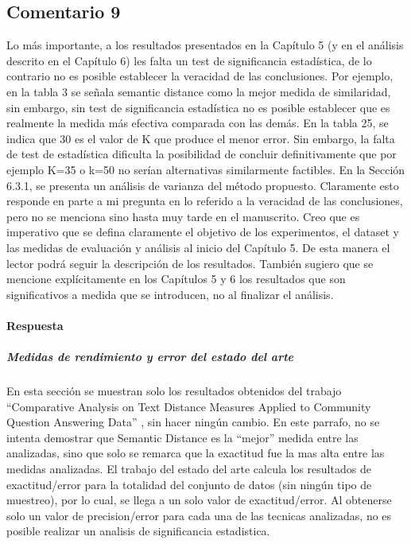 \subsection*{Comentario 9}
Lo más importante, a los resultados presentados en la Capítulo 5 (y en el análisis descrito en el Capítulo 6) les falta un test de significancia estadística, de lo contrario no es posible establecer la veracidad de las conclusiones. Por ejemplo, en la tabla 3 se señala semantic distance como la mejor medida de similaridad, sin embargo, sin test de significancia estadística no es posible establecer que es realmente la medida más efectiva comparada con las demás. En la tabla 25, se indica que 30 es el valor de K que produce el menor error. Sin embargo, la falta de test de estadística dificulta la posibilidad de concluir definitivamente que por ejemplo K=35 o k=50 no serían alternativas similarmente factibles. En la Sección 6.3.1, se presenta un análisis de varianza del método propuesto. Claramente esto responde en parte a mi pregunta en lo referido a la veracidad de las conclusiones, pero no se menciona sino hasta muy tarde en el manuscrito. Creo que es imperativo que se defina claramente el objetivo de los experimentos, el dataset y las medidas de evaluación y análisis al inicio del Capítulo 5. De esta manera el lector podrá seguir la descripción de los resultados. También sugiero que se mencione explícitamente en los Capítulos 5 y 6 los resultados que son significativos a medida que se introducen, no al finalizar el análisis.

\paragraph*{Respuesta}
\subparagraph{Medidas de rendimiento y error del estado del arte}
En esta sección se muestran solo los resultados obtenidos del trabajo “Comparative Analysis on Text Distance Measures Applied to Community Question Answering Data” \citep{gonzalez2017comparative}, sin hacer ningún cambio. En este parrafo, no se intenta demostrar que Semantic Distance es la “mejor” medida entre las analizadas, sino que solo se remarca que la exactitud fue la mas alta entre las medidas analizadas. El trabajo del estado del arte calcula los resultados de exactitud/error para la totalidad del conjunto de datos (sin ningún tipo de muestreo), por lo cual, se llega a un solo valor de exactitud/error. Al obtenerse solo un valor de precision/error para cada una de las tecnicas analizadas, no es posible realizar un analisis de significancia estadistica.

